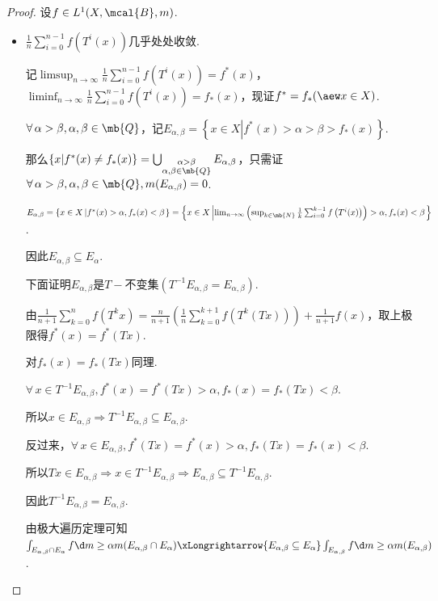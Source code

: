 \begin{proof}
    设$f\in L^1(X,\mcal{B},m)$.\par
    \begin{itemize}
        \item $\frac{1}{n}\sum_{i=0}^{n-1}{f\left(T^i(x)\right)}$几乎处处收敛.\par
        记$\limsup_{n\to\infty}{\frac{1}{n}\sum_{i=0}^{n-1}{f\left(T^i(x)\right)}}=f^*(x)$，$\liminf_{n\to\infty}{\frac{1}{n}\sum_{i=0}^{n-1}{f\left(T^i(x)\right)}}=f_*(x)$，现证$f^*=f_*(\aew x\in X)$.\par
        $\forall\,\alpha>\beta,\alpha,\beta\in\mb{Q}$，记$E_{\alpha,\beta}=\left\{x\in X \left|f^*(x)>\alpha>\beta>f_*(x) \right.\right\}$.\par
        那么$\left\{x|f^*(x)\neq f_*(x)\right\}=\bigcup_{\substack{\alpha>\beta \\ \alpha,\beta\in\mb{Q}}}{E_{\alpha,\beta}}$，只需证$\forall\,\alpha>\beta,\alpha,\beta\in\mb{Q},m(E_{\alpha,\beta})=0$. \par
        $E_{\alpha,\beta}=\left\{x\in X\left|f^*(x)>\alpha,f_*(x)<\beta\right.\right\}=\left\{x\in X\left|\lim_{n\to\infty}\left(\sup_{k\in\mb{N}}{\frac{1}{k}\sum_{i=0}^{k-1}{f\left(T^i(x)\right)}}\right)>\alpha,f_*(x)<\beta\right.\right\}$.\par
        因此$E_{\alpha,\beta}\subseteq E_\alpha$.\par
        下面证明$E_{\alpha,\beta}$是$T-$不变集$(T^{-1}E_{\alpha,\beta}=E_{\alpha,\beta})$.\par
        由$\frac{1}{n+1}\sum_{k=0}^n{f \left(T^k{x}\right)}=\frac{n}{n+1}\left(\frac{1}{n}\sum_{k=0}^{k+1}{f \left(T^k(Tx)\right)}\right)+\frac{1}{n+1}f(x)$，取上极限得$f^*(x)=f^*(Tx)$.\par
        对$f_*(x)=f_*(Tx)$同理.\par
        $\forall\, x\in T^{-1}E_{\alpha,\beta},f^*(x)=f^*(Tx)>\alpha,f_*(x)=f_*(Tx)<\beta$.\par
        所以$x\in E_{\alpha,\beta}\Rightarrow T^{-1}E_{\alpha,\beta}\subseteq E_{\alpha,\beta}$.\par
        反过来，$\forall\, x\in E_{\alpha,\beta},f^*(Tx)=f^*(x)>\alpha,f_*(Tx)=f_*(x)<\beta$.\par
        所以$Tx\in E_{\alpha,\beta}\Rightarrow x\in T^{-1}E_{\alpha,\beta}\Rightarrow E_{\alpha,\beta}\subseteq T^{-1}E_{\alpha,\beta}$.\par
        因此$T^{-1}E_{\alpha,\beta}=E_{\alpha,\beta}$.\par
        由极大遍历定理可知$\int_{E_{\alpha,\beta}\cap E_\alpha}{f}\d m\geq \alpha m(E_{\alpha,\beta}\cap E_\alpha)\xLongrightarrow{E_{\alpha,\beta}\subseteq E_\alpha}\int_{E_{\alpha,\beta}}{f}\d m\geq \alpha m(E_{\alpha,\beta})$.\par

\end{itemize}
\end{proof}

